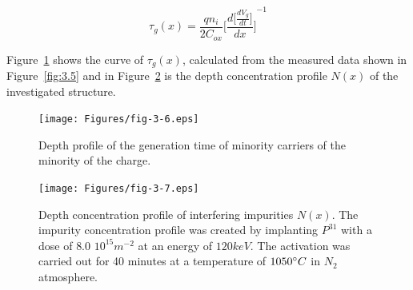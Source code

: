 \begin{equation}\label{eq:3.10}
  \tau_g(x) = \frac{qn_i}{2C_{ox}} {\Bigg[\frac{d\big[\frac{dV_g}{dt}\big]}{dx}\Bigg]}^{-1}
\end{equation}

Figure~\ref{fig:3.6} shows the curve of $\tau_g(x)$, calculated
from the measured data shown in Figure~\ref{fig:3.5} and in
Figure~\ref{fig:3.7} is the depth concentration profile $N(x)$ of the investigated
structure.

\begin{figure}[h!]\centering
  \texttt{[image: Figures/fig-3-6.eps]}
  \caption[Depth profile of the generation lifetime of minority carriers
    charge]{Depth profile of the generation time of minority carriers
    of the minority of the charge.}\label{fig:3.6}
\end{figure}

\begin{figure}[h!]\centering
  \texttt{[image: Figures/fig-3-7.eps]}
  \caption[Depth profile of concentration of interfering impurities
    $N(x)$]{Depth concentration profile of interfering impurities
    $N(x)$. The impurity concentration profile was created by implanting
    $P^{31}$ with a dose of $8.0$ $10^{15}m^{-2}$ at an energy of $120 keV$.
    The activation was carried out for 40 minutes at a temperature of $1050 \degree C$ in
    $N_2$ atmosphere.}\label{fig:3.7}
\end{figure}


